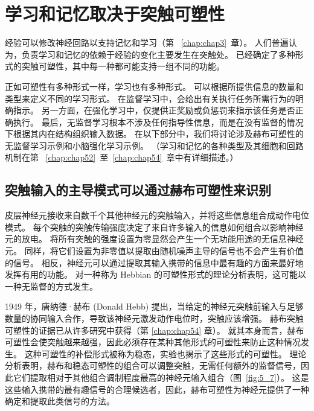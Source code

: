 \section{学习和记忆取决于突触可塑性}

经验可以修改神经回路以支持记忆和学习（第 ~\ref{chap:chap3}~章）。 
人们普遍认为，负责学习和记忆的依赖于经验的变化主要发生在突触处。 
已经确定了多种形式的突触可塑性，其中每一种都可能支持一组不同的功能。


正如可塑性有多种形式一样，学习也有多种形式。
可以根据所提供信息的数量和类型来定义不同的学习形式。
在监督学习中，会给出有关执行任务所需行为的明确指示。
另一方面，在强化学习中，仅提供正奖励或负惩罚来指示该任务是否正确执行。
最后，无监督学习根本不涉及任何指导性信息，而是在没有监督的情况下根据其内在结构组织输入数据。
在以下部分中，我们将讨论涉及赫布可塑性的无监督学习示例和小脑强化学习示例。
（学习和记忆的各种类型及其细胞和回路机制在第 ~\ref{chap:chap52}~至~\ref{chap:chap54}~章中有详细描述。）



\subsection{突触输入的主导模式可以通过赫布可塑性来识别}

皮层神经元接收来自数千个其他神经元的突触输入，并将这些信息组合成动作电位模式。
每个突触的突触传输强度决定了来自许多输入的信息如何组合以影响神经元的放电。
将所有突触的强度设置为零显然会产生一个无功能用途的无信息神经元。
同样，将它们设置为非零值以提取由随机噪声主导的信号也不会产生有价值的信号。
相反，神经元可以通过提取其输入携带的信息中最有趣的方面来最好地发挥有用的功能。
对一种称为 Hebbian 的可塑性形式的理论分析表明，这可能以一种无监督的方式发生。


1949 年，唐纳德·赫布 (Donald Hebb) 提出，当给定的神经元突触前输入与足够数量的协同输入合作，导致该神经元激发动作电位时，突触应该增强。 
赫布突触可塑性的证据已从许多研究中获得（第 \ref{chap:chap54} 章）。 
就其本身而言，赫布可塑性会使突触越来越强，因此必须存在某种其他形式的可塑性来防止这种情况发生。 
这种可塑性的补偿形式被称为稳态，实验也揭示了这些形式的可塑性。 
理论分析表明，赫布和稳态可塑性的组合可以调整突触，无需任何额外的监督信号，因此它们提取相对于其他组合调制程度最高的神经元输入组合（图~\ref{fig:5_7}）。 
这是这些输入携带的最有趣信号的合理候选者，因此，赫布可塑性为神经元提供了一种确定和提取此类信号的方法。

